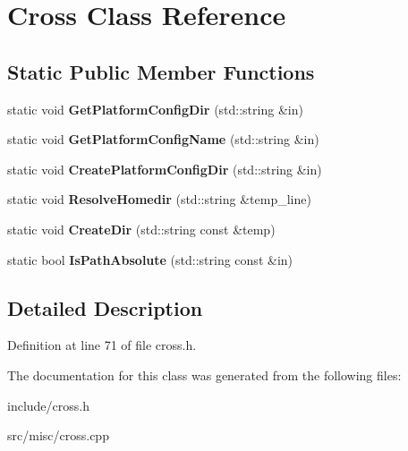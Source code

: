 \hypertarget{classCross}{\section{Cross Class Reference}
\label{classCross}
}
\subsection*{Static Public Member Functions}
\begin{DoxyCompactItemize}
\item 
\hypertarget{classCross_ae970b76d2aaead7f55e7b1a05574a880}{static void {\bfseries Get\-Platform\-Config\-Dir} (std\-::string \&in)}\label{classCross_ae970b76d2aaead7f55e7b1a05574a880}

\item 
\hypertarget{classCross_a76229c50352b8f4f44dbcd68a7fb4f7d}{static void {\bfseries Get\-Platform\-Config\-Name} (std\-::string \&in)}\label{classCross_a76229c50352b8f4f44dbcd68a7fb4f7d}

\item 
\hypertarget{classCross_ac95e21d0ca9ec1e467b680e9bdbbfc33}{static void {\bfseries Create\-Platform\-Config\-Dir} (std\-::string \&in)}\label{classCross_ac95e21d0ca9ec1e467b680e9bdbbfc33}

\item 
\hypertarget{classCross_ac79890893bb87e04d37f8d2935cc80a8}{static void {\bfseries Resolve\-Homedir} (std\-::string \&temp\-\_\-line)}\label{classCross_ac79890893bb87e04d37f8d2935cc80a8}

\item 
\hypertarget{classCross_a9674b6158cf06a616ba6f899f72693b2}{static void {\bfseries Create\-Dir} (std\-::string const \&temp)}\label{classCross_a9674b6158cf06a616ba6f899f72693b2}

\item 
\hypertarget{classCross_aed9b05e77ca4087abed9cfd0460c7408}{static bool {\bfseries Is\-Path\-Absolute} (std\-::string const \&in)}\label{classCross_aed9b05e77ca4087abed9cfd0460c7408}

\end{DoxyCompactItemize}


\subsection{Detailed Description}


Definition at line 71 of file cross.\-h.



The documentation for this class was generated from the following files\-:\begin{DoxyCompactItemize}
\item 
include/cross.\-h\item 
src/misc/cross.\-cpp\end{DoxyCompactItemize}
